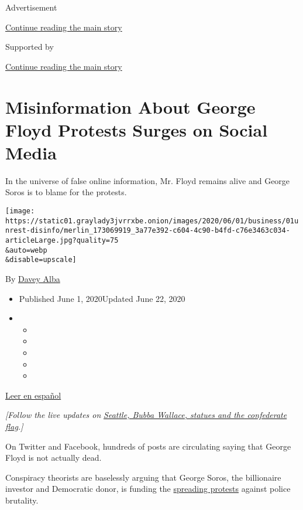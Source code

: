 Advertisement

\protect\hyperlink{after-top}{Continue reading the main story}

Supported by

\protect\hyperlink{after-sponsor}{Continue reading the main story}

\hypertarget{misinformation-about-george-floyd-protests-surges-on-social-media}{%
\section{Misinformation About George Floyd Protests Surges on Social
Media}\label{misinformation-about-george-floyd-protests-surges-on-social-media}}

In the universe of false online information, Mr. Floyd remains alive and
George Soros is to blame for the protests.

\texttt{[image: https://static01.graylady3jvrrxbe.onion/images/2020/06/01/business/01unrest-disinfo/merlin\_173069919\_3a77e392-c604-4c90-b4fd-c76e3463c034-articleLarge.jpg?quality=75\\\&auto=webp\\\&disable=upscale]}

By \href{https://www.nytimes3xbfgragh.onion/by/davey-alba}{Davey Alba}

\begin{itemize}
\item
  Published June 1, 2020Updated June 22, 2020
\item
  \begin{itemize}
  \item
  \item
  \item
  \item
  \item
  \end{itemize}
\end{itemize}

\href{https://www.nytimes3xbfgragh.onion/es/2020/06/03/espanol/ciencia-y-tecnologia/george-floyd-desinformacion-fake-news.html}{Leer
en español}

\emph{{[}Follow the live updates on}
\href{https://www.nytimes3xbfgragh.onion/2020/06/22/us/seattle-shooting-roosevelt-statue-nascar-noose.html}{\emph{Seattle,
Bubba Wallace, statues and the confederate flag}}\emph{.{]}}

On Twitter and Facebook, hundreds of posts are circulating saying that
George Floyd is not actually dead.

Conspiracy theorists are baselessly arguing that George Soros, the
billionaire investor and Democratic donor, is funding the
\href{https://www.nytimes3xbfgragh.onion/live/2020/george-floyd-protests-today-06-01}{spreading
protests} against police brutality.

